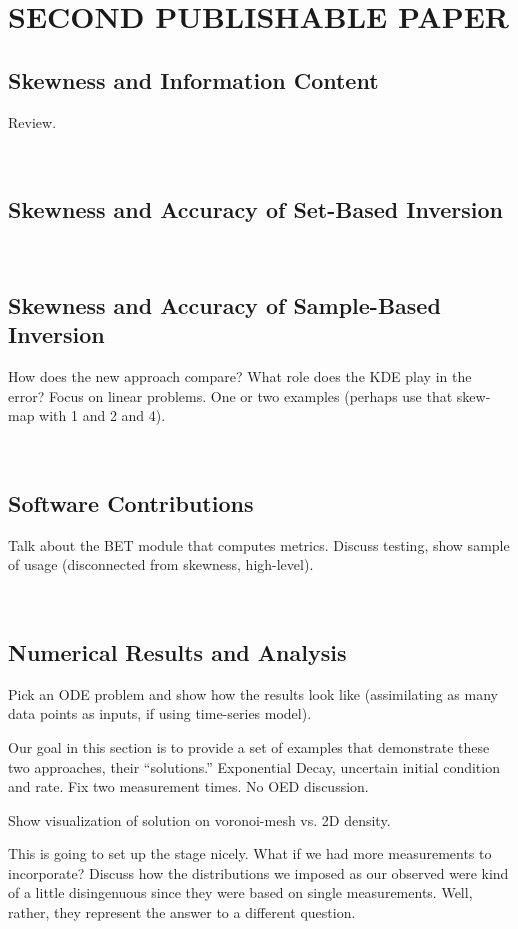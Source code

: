 \chapter{\uppercase{Second Publishable Paper} \label{chapter:03}}

\section{Skewness and Information Content}
Review.

\
\section{Skewness and Accuracy of Set-Based Inversion}


\
\section{Skewness and Accuracy of Sample-Based Inversion}

How does the new approach compare? What role does the KDE play in the error?
Focus on linear problems. One or two examples (perhaps use that skew-map with 1 and 2 and 4).

\
\section{Software Contributions}

Talk about the BET module that computes metrics.
Discuss testing, show sample of usage (disconnected from skewness, high-level).

\
\section{Numerical Results and Analysis}

Pick an ODE problem and show how the results look like (assimilating as many data points as inputs, if using time-series model). 

Our goal in this section is to provide a set of examples that demonstrate these two approaches, their ``solutions.''
Exponential Decay, uncertain initial condition and rate. Fix two measurement times. No OED discussion.

Show visualization of solution on voronoi-mesh vs. 2D density. 

This is going to set up the stage nicely.
What if we had more measurements to incorporate? Discuss how the distributions we imposed as our observed were kind of a little disingenuous since they were based on single measurements. Well, rather, they represent the answer to a different question.

